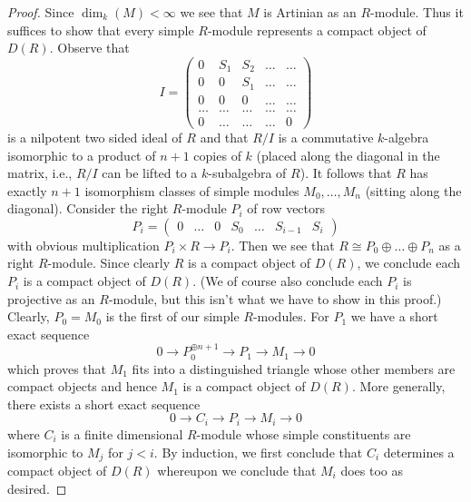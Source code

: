\begin{proof}
\medskip\noindent
Since $\dim_k(M) < \infty$ we see that $M$ is Artinian as an $R$-module.
Thus it suffices to show that every simple $R$-module represents a
compact object of $D(R)$. Observe that
$$
I =
\left(
\begin{matrix}
0 & S_1 & S_2 & \ldots & \ldots \\
0 & 0 & S_1 & \ldots & \ldots\\
0 & 0 & 0 & \ldots & \ldots \\
\ldots & \ldots & \ldots & \ldots & \ldots \\
0 & \ldots & \ldots & \ldots & 0
\end{matrix}
\right)
$$
is a nilpotent two sided ideal of $R$ and that $R/I$
is a commutative $k$-algebra isomorphic to a product of $n + 1$ copies of
$k$ (placed along the diagonal in the matrix, i.e., $R/I$ can be lifted
to a $k$-subalgebra of $R$). It follows that $R$ has exactly $n + 1$
isomorphism classes of simple modules $M_0, \ldots, M_n$ (sitting along
the diagonal). Consider the right $R$-module $P_i$ of row vectors
$$
P_i =
\left(
\begin{matrix}
0 &
\ldots &
0 &
S_0 &
\ldots &
S_{i - 1} &
S_i
\end{matrix}
\right)
$$
with obvious multiplication $P_i \times R \to P_i$. Then we see that
$R \cong P_0 \oplus \ldots \oplus P_n$ as a right $R$-module. Since clearly
$R$ is a compact object of $D(R)$, we conclude each $P_i$ is a compact
object of $D(R)$. (We of course also conclude each $P_i$ is projective
as an $R$-module, but this isn't what we have to show in this proof.)
Clearly, $P_0 = M_0$ is the first of our simple $R$-modules.
For $P_1$ we have a short exact sequence
$$
0 \to P_0^{\oplus n + 1} \to P_1 \to M_1 \to 0
$$
which proves that $M_1$ fits into a distinguished triangle whose
other members are compact objects and hence $M_1$ is a compact
object of $D(R)$. More generally, there exists a short exact sequence
$$
0 \to C_i \to P_i \to M_i \to 0
$$
where $C_i$ is a finite dimensional $R$-module whose simple constituents
are isomorphic to $M_j$ for $j < i$. By induction, we first conclude that
$C_i$ determines a compact object of $D(R)$ whereupon we conclude that $M_i$
does too as desired.
\end{proof}

